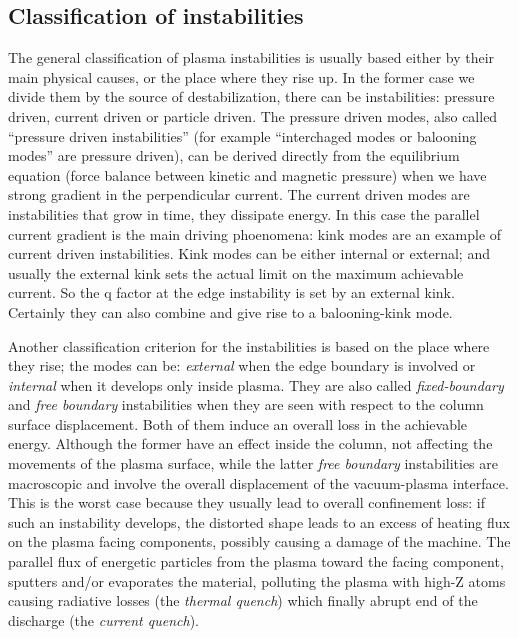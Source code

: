 \subsection{Classification of instabilities}
\label{sez:classificazione}

The general classification of plasma instabilities is usually based either by their main physical causes, or the place where they rise up.
%
In the former case we divide them by the source of destabilization, there can be instabilities: pressure driven, current driven or particle driven. 
The pressure driven modes, also called “pressure driven instabilities” (for example “interchaged modes or balooning modes” are pressure driven), can be derived directly from the equilibrium equation (force balance between kinetic and magnetic pressure) when we have strong gradient in the perpendicular current.
The current driven modes are instabilities that grow in time, they dissipate energy. In this case the parallel current gradient is the main driving phoenomena: kink modes are an example of current driven instabilities. Kink modes can be either internal or external; and usually the external kink sets the actual limit on the maximum achievable current. So the q factor at the edge instability is set by an external kink. Certainly they can also combine and give rise to a balooning-kink mode.

Another classification criterion for the instabilities is based on the place where they rise; the modes can be: \emph{external} when the edge boundary is involved or \emph{internal} when it develops only inside plasma. 
They are also called \emph{fixed-boundary} and \emph{free boundary} instabilities when they are seen with respect to the column surface displacement. Both of them induce an overall loss in the achievable energy. Although the former have an effect inside the column, not affecting the movements of the plasma surface, while the latter \emph{free boundary} instabilities are macroscopic and involve the overall displacement of the vacuum-plasma interface.
This is the worst case because they usually lead to overall confinement loss: if such an instability develops, the distorted shape leads to an excess of heating flux on the plasma facing components, possibly causing a damage of the machine. The parallel flux of energetic particles from the plasma toward the facing component, sputters and/or evaporates the material, polluting the plasma with high-Z atoms causing  radiative losses (the \emph{thermal quench}) which finally abrupt end of the discharge (the \emph{current quench}).

